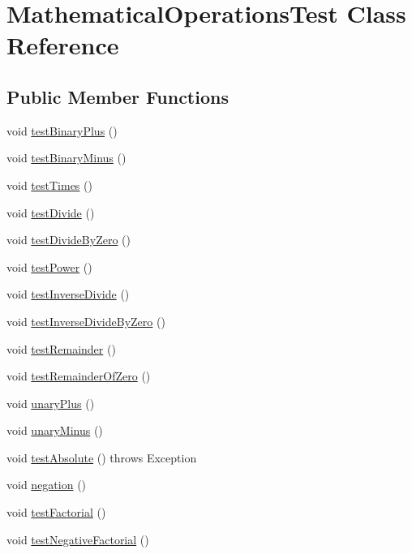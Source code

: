 \hypertarget{class_mathematical_operations_test}{}\section{Mathematical\+Operations\+Test Class Reference}
\label{class_mathematical_operations_test}
\subsection*{Public Member Functions}
\begin{DoxyCompactItemize}
\item 
void \hyperlink{class_mathematical_operations_test_ac9a8aa693135a0399e919af1dd0f5800}{test\+Binary\+Plus} ()
\item 
void \hyperlink{class_mathematical_operations_test_a261148dc4165aae72f236d717ee9d5a7}{test\+Binary\+Minus} ()
\item 
void \hyperlink{class_mathematical_operations_test_a33eb619d1aeefcd26c5e0c369f49e09f}{test\+Times} ()
\item 
void \hyperlink{class_mathematical_operations_test_a3b927bd64d1f07f6be17f26a7c15bdd5}{test\+Divide} ()
\item 
void \hyperlink{class_mathematical_operations_test_a8ca00263e0c83d0d3e0963c876d9ecb4}{test\+Divide\+By\+Zero} ()
\item 
void \hyperlink{class_mathematical_operations_test_a9a63f2e7c045aeb34a8e3b6d114b3923}{test\+Power} ()
\item 
void \hyperlink{class_mathematical_operations_test_a24c98f3babaea9451d5a3e008bcac821}{test\+Inverse\+Divide} ()
\item 
void \hyperlink{class_mathematical_operations_test_ad5956ab567db242cd144336da878eeb4}{test\+Inverse\+Divide\+By\+Zero} ()
\item 
void \hyperlink{class_mathematical_operations_test_a8c4c35d92a93897c5195b50e734ad397}{test\+Remainder} ()
\item 
void \hyperlink{class_mathematical_operations_test_a1f3fc4f80f00d1c19b5bf332e9755919}{test\+Remainder\+Of\+Zero} ()
\item 
void \hyperlink{class_mathematical_operations_test_abded7119764f0b33a44c747e72c92548}{unary\+Plus} ()
\item 
void \hyperlink{class_mathematical_operations_test_aeffc079c0e4916d15aead2f73d56a3cb}{unary\+Minus} ()
\item 
void \hyperlink{class_mathematical_operations_test_a975dba48734f030ecd121df8a116dd8d}{test\+Absolute} ()  throws Exception 
\item 
void \hyperlink{class_mathematical_operations_test_a366a7e761a0a597bb96e12ef57630cec}{negation} ()
\item 
void \hyperlink{class_mathematical_operations_test_adedfdb2ccd42d65230f2eee10473195c}{test\+Factorial} ()
\item 
void \hyperlink{class_mathematical_operations_test_a220eab8b77fdda82b2478aa2d3020fd8}{test\+Negative\+Factorial} ()
\end{DoxyCompactItemize}
